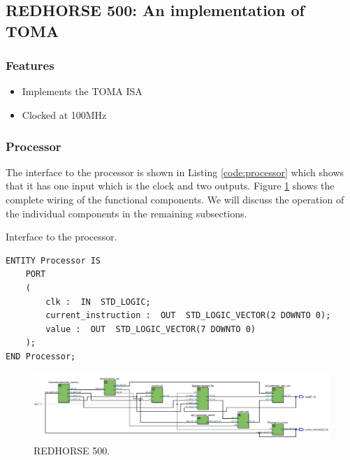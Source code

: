 \documentclass[a4paper, 11pt,oneside]{article}
\begin{document}
\subsection{REDHORSE 500: An implementation of TOMA}

\subsubsection{Features}
\begin{itemize}
\item Implements the TOMA ISA
\item Clocked at 100MHz
\end{itemize}

\subsubsection{Processor}
The interface to the processor is shown in Listing \ref{code:processor} which 
shows that it has one input which is the clock and two outputs. Figure 
\ref{fig:redhorse500} shows the complete wiring of the functional components. 
We will discuss the operation of the individual components in the remaining 
subsections. 

\begin{listing}[H]
\caption{Interface to the processor.}
\label{code:processor}
\begin{verbatim}
ENTITY Processor IS 
    PORT
    (
        clk :  IN  STD_LOGIC;
        current_instruction :  OUT  STD_LOGIC_VECTOR(2 DOWNTO 0);
        value :  OUT  STD_LOGIC_VECTOR(7 DOWNTO 0)
    );
END Processor;
\end{verbatim}
\end{listing}

\begin{landscape}
\thispagestyle{plain}
\begin{figure}[H]
	\begin{center}
	\includegraphics[width=10.5in]{redhorse500.png}
	\caption{REDHORSE 500.}
	\label{fig:redhorse500} 
	\end{center}
\end{figure}
\end{landscape}
\end{document}
